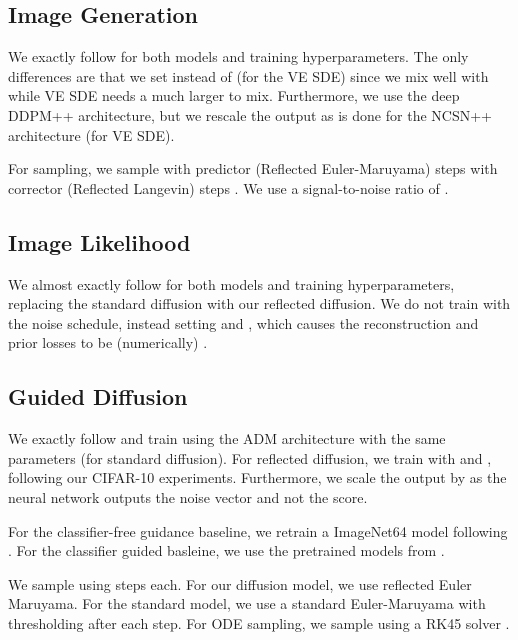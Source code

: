 \documentclass{article}
\theoremstyle{plain}
\theoremstyle{definition}
\theoremstyle{remark}
\begin{document}
\subsection{Image Generation}\label{sec:app:experiment:imgqual}

We exactly follow \citet{Song2020ScoreBasedGM} for both models and training hyperparameters. The only differences are that we set  instead of  (for the VE SDE) since we mix well with  while VE SDE needs a much larger  to mix. Furthermore, we use the deep DDPM++ architecture, but we rescale the output  as is done for the NCSN++ architecture (for VE SDE).

For sampling, we sample with  predictor (Reflected Euler-Maruyama) steps with  corrector (Reflected Langevin) steps \citep{Song2020ScoreBasedGM}. We use a signal-to-noise ratio of .

\subsection{Image Likelihood}\label{sec:app:experiment:imglike}

We almost exactly follow \citet{Kingma2021VariationalDM} for both models and training hyperparameters, replacing the standard diffusion with our reflected diffusion. We do not train with the noise schedule, instead setting  and , which causes the reconstruction and prior losses to be (numerically) .

\subsection{Guided Diffusion}\label{sec:app:experiment:guided}

We exactly follow \citet{Ho2022ClassifierFreeDG} and train using the ADM architecture \citep{Dhariwal2021DiffusionMB} with the same parameters (for standard diffusion). For reflected diffusion, we train with  and , following our CIFAR-10 experiments. Furthermore, we scale the output by  as the neural network outputs the noise vector and not the score.

For the classifier-free guidance baseline, we retrain a ImageNet64 model following \citet{Ho2022ClassifierFreeDG}. For the classifier guided basleine, we use the pretrained models from \citet{Dhariwal2021DiffusionMB}.

We sample using  steps each. For our diffusion model, we use reflected Euler Maruyama. For the standard model, we use a standard Euler-Maruyama with thresholding after each step. For ODE sampling, we sample using a RK45 solver \citep{Dormand1980AFO}.
\end{document}

